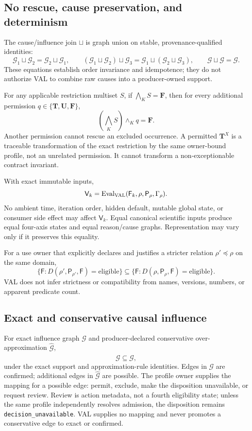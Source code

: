 \subsection{No rescue, cause preservation, and determinism}

The cause/influence join $\sqcup$ is graph union on stable,
provenance-qualified identities:
\[
 \mathcal G_1\sqcup\mathcal G_2=\mathcal G_2\sqcup\mathcal G_1,\qquad
 (\mathcal G_1\sqcup\mathcal G_2)\sqcup\mathcal G_3
 =\mathcal G_1\sqcup(\mathcal G_2\sqcup\mathcal G_3),\qquad
 \mathcal G\sqcup\mathcal G=\mathcal G.
\]
These equations establish order invariance and idempotence; they do not
authorize VAL to combine raw causes into a producer-owned support.

For any applicable restriction multiset $S$, if
$\bigwedge_K S=\mathbf F$, then for every additional permission
$q\in\{\mathbf T,\mathbf U,\mathbf F\}$,
\[
 \left(\bigwedge_K S\right)\wedge_K q=\mathbf F.
\]
Another permission cannot rescue an excluded occurrence. A permitted
$\mathbf T^X$ is a traceable transformation of the exact restriction by the
same owner-bound profile, not an unrelated permission. It cannot transform a
non-exceptionable contract invariant.

With exact immutable inputs,
\[
 \mathsf V_k=\operatorname{Eval}_{\rm VAL}
 (\mathsf F_k,\rho,\mathsf P_\rho,\Gamma_\rho).
\]
No ambient time, iteration order, hidden default, mutable global state, or
consumer side effect may affect $\mathsf V_k$. Equal canonical scientific
inputs produce equal four-axis states and equal reason/cause graphs.
Representation may vary only if it preserves this equality.

For a use owner that explicitly declares and justifies a stricter relation
$\rho'\preceq\rho$ on the same domain,
\[
 \{\mathsf F:D(\rho',\mathsf P_{\rho'},\mathsf F)=\mathrm{eligible}\}
 \subseteq
 \{\mathsf F:D(\rho,\mathsf P_\rho,\mathsf F)=\mathrm{eligible}\}.
\]
VAL does not infer strictness or compatibility from names, versions, numbers,
or apparent predicate count.

\subsection{Exact and conservative causal influence}

For exact influence graph $\mathcal G$ and producer-declared conservative
over-approximation $\widehat{\mathcal G}$,
\[
 \mathcal G\subseteq\widehat{\mathcal G},
\]
under the exact support and approximation-rule identities. Edges in
$\mathcal G$ are confirmed; additional edges in
$\widehat{\mathcal G}$ are possible. The profile owner supplies the mapping
for a possible edge: permit, exclude, make the disposition unavailable, or
request review. Review is action metadata, not a fourth eligibility state;
unless the same profile independently resolves admission, the disposition
remains \texttt{decision\_unavailable}. VAL supplies no mapping and never
promotes a conservative edge to exact or confirmed.

